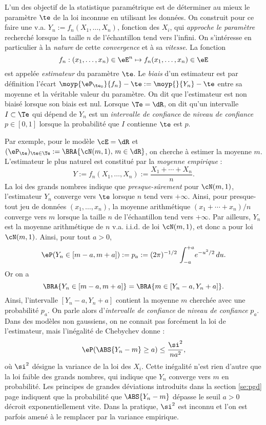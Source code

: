 L'un des objectif de la statistique paramétrique est de déterminer au mieux le
paramètre $\te$ de la loi inconnue en utilisant les données. On construit pour
ce faire une v.a. $Y_n:=f_n(X_1,\ldots,X_n)$, fonction des $X_i$, qui
\emph{approche le paramètre} recherché lorsque la taille $n$ de l'échantillon
tend vers l'infini. On s'intéresse en particulier à la \emph{nature} de cette
\emph{convergence} et à sa \emph{vitesse}.  La fonction
$$
f_n:(x_1,\ldots,x_n)\in\eE^n\mapsto f_n(x_1,\ldots,x_n)\in\eE
$$
est appelée \emph{estimateur} du paramètre $\te$. Le \emph{biais} d'un
estimateur est par définition l'écart
$\moyp{\eP_{\te_0}}{f_n}-\te:=\moyp{}{Y_n}-\te$ entre sa moyenne et la véritable
valeur du paramètre.  On dit que l'estimateur est non biaisé lorsque son biais
est nul. Lorsque $\Te=\dR$, on dit qu'un intervalle $I\subset\Te$ qui dépend de
$Y_n$ est un \emph{intervalle de confiance} de \emph{niveau de confiance}
$p\in[0,1]$ lorsque la probabilité que $I$ contienne $\te$ est $p$.

Par exemple, pour le modèle $\cE=\dR$ et
$(\eP_\te)_{\te\in\Te}:=\BRA{\cN(m,1),\,m\in\dR}$, on cherche à estimer la moyenne
$m$. L'estimateur le plus naturel est constitué par la \emph{moyenne
  empirique} :
$$
Y:=f_n(X_1,\ldots,X_n):=\frac{X_1+\cdots+X_n}{n}.
$$
La loi des grands nombres indique que \emph{presque-sûrement} pour
$\cN(m,1)$, l'estimateur $Y_n$ converge vers $\te$ lorsque $n$ tend vers $+\infty$.
Ainsi, pour presque-tout jeu de données $(x_1,\ldots,x_n)$, la moyenne arithmétique
$(x_1+\cdots+x_n)/n$ converge vers $m$ lorsque la taille $n$ de l'échantillon tend
vers $+\infty$.  Par ailleurs, $Y_n$ est la moyenne arithmétique de $n$ v.a. i.i.d.
de loi $\cN(m,1)$, et donc a pour loi $\cN(m,1)$. Ainsi, pour tout $a>0$,
$$
\eP(Y_n\in [m-a,m+a]):=p_a:=(2\pi)^{-1/2}\,\int_{-a}^{+a}\!e^{-u^2/2}\,du.
$$
Or on a
$$
\BRA{Y_n\in [m-a,m+a]}=\BRA{m\in[Y_n-a,Y_n+a]}.
$$
Ainsi, l'intervalle $[Y_n-a,Y_n+a]$ contient la moyenne $m$ cherchée avec
une probabilité $p_a$. On parle alors d'\emph{intervalle de confiance} de
\emph{niveau de confiance} $p_a$. Dans des modèles non gaussiens, on ne
connait pas forcément la loi de l'estimateur, mais l'inégalité de Chebychev
donne :
$$
\eP(\ABS{Y_n-m} \geq a) \leq \frac{\si^2}{na^2},
$$
où $\si^2$ désigne la variance de la loi des $X_i$. Cette inégalité n'est
rien d'autre que la loi faible des grands nombres, qui indique que $Y_n$
converge vers $m$ en probabilité. Les principes de grandes déviations
introduits dans la section \ref{se:pgd} page \pageref{se:pgd} indiquent que la
probabilité que $\ABS{Y_n-m}$ dépasse le seuil $a>0$ décroit exponentiellement
vite. Dans la pratique, $\si^2$ est inconnu et l'on est parfois amené à le
remplacer par la variance empirique.

